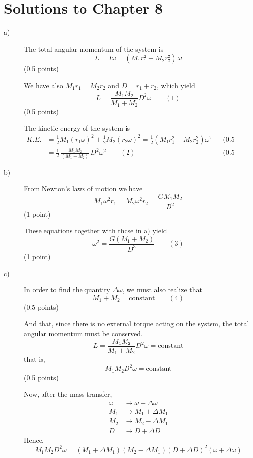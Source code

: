 \clearpage
\section*{Solutions to Chapter 8}

\begin{description}
\item[a)] The total angular momentum of the system is
\[ L = I\omega = (M_1 r_1^2 + M_2 r_2^2)\,\omega \]
\hfill(0.5 points)

We have also $M_1 r_1 = M_2 r_2$ and $D = r_1 + r_2$, which yield
\[ L = \frac{M_1 M_2}{M_1 + M_2} D^2 \omega \qquad (1) \]
\hfill(0.5 points)

The kinetic energy of the system is
\begin{align*}
K.E. &= \frac{1}{2} M_1 (r_1\omega)^2 + \frac{1}{2} M_2 (r_2\omega)^2
  = \frac{1}{2}\left(M_1 r_1^2 + M_2 r_2^2\right)\omega^2
  && \text{(0.5 points)} \\
&= \frac{1}{2}\,\frac{M_1 M_2}{(M_1 + M_2)}\, D^2\omega^2
  \qquad (2)
  && \text{(0.5 points)}
\end{align*}

\item[b)] From Newton's laws of motion we have
\[ M_1\omega^2 r_1 = M_2\omega^2 r_2 = \frac{G M_1 M_2}{D^2} \]
\hfill(1 point)

These equations together with those in a) yield
\[ \omega^2 = \frac{G(M_1 + M_2)}{D^3} \qquad (3) \]
\hfill(1 point)

\item[c)] In order to find the quantity $\Delta\omega$, we must also realize
that
\[ M_1 + M_2 = \text{constant} \qquad (4) \]
\hfill(0.5 points)

And that, since there is no external torque acting on the system, the total
angular momentum must be conserved.
\[ L = \frac{M_1 M_2}{M_1 + M_2} D^2\omega = \text{constant} \]
that is,
\[ M_1 M_2 D^2 \omega = \text{constant} \]
\hfill(0.5 points)

Now, after the mass transfer,
\begin{align*}
\omega &\to \omega + \Delta\omega \\
M_1 &\to M_1 + \Delta M_1 \\
M_2 &\to M_2 - \Delta M_1 \\
D &\to D + \Delta D
\end{align*}
Hence,
\[ M_1 M_2 D^2\omega
   = \left(M_1 + \Delta M_1\right)\left(M_2 - \Delta M_1\right)
     \left(D + \Delta D\right)^2\left(\omega + \Delta\omega\right) \]


\end{description}
